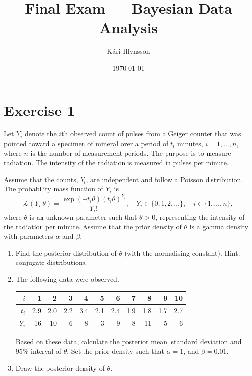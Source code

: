 \documentclass[
]{homework}
\title{Final Exam --- Bayesian Data Analysis}
\author{Kári Hlynsson}
\date{\today}
\begin{document}
\maketitle

\section{Exercise 1}\label{exercise-1}

Let \(Y_i\) denote the \(i\)th observed count of pulses from a Geiger counter that was pointed toward a specimen of mineral over a period of
\(t_i\) minutes, \(i = 1, \ldots, n\), where \(n\) is the number of measurement periods. The purpose is to measure radiation. The intensity of the
radiation is measured in pulses per minute.

Assume that the counts, \(Y_i\), are independent and follow a Poisson distribution. The probability mass function of \(Y_i\) is
\[
  \mathcal L(Y_i | \theta) = \frac{\exp(-t_i\theta)(t_i\theta)^{Y_i}}{Y_i!}, \quad Y_i \in \{0, 1, 2, \ldots \}, \quad i \in \{1, \ldots, n\},
\]
where \(\theta\) is an unknown parameter such that \(\theta > 0\), representing the intensity of the radiation per minute. Assume that the prior density
of \(\theta\) is a gamma density with parameters \(\alpha\) and \(\beta\).

\begin{enumerate}[label = (\alph*)]
  \item Find the posterior distribution of $\theta$ (with the normalising constant). Hint: conjugate distributions.
  \item The following data were observed.
  \begin{table}[H]
    \centering
    \begin{tabular}{r|rrrrrrrrrr}
      \toprule
      $i$   & 1 & 2 & 3 & 4 & 5 & 6 & 7 & 8 & 9 & 10 \\
      \midrule
      $t_i$ & 2.9 & 2.0 & 2.2 & 3.4 & 2.1 & 2.4 & 1.9 & 1.8 & 1.7 & 2.7 \\
      $Y_i$ &  16 &  10 &   6 &   8 &   3 &   9 &   8 &  11 &   5 &   6 \\
      \bottomrule
    \end{tabular}
  \end{table}

Based on these data, calculate the posterior mean, standard deviation and 95\% interval of $\theta$. Set the prior
density such that $\alpha = 1$, and $\beta = 0.01$.

\item Draw the posterior density of $\theta$.

\end{enumerate}
\end{document}
